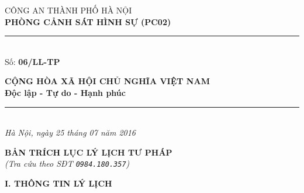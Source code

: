 \documentclass[12pt,a4paper]{article}
\begin{document}
\noindent
\begin{minipage}[t]{0.46\textwidth}
    \begin{center}
        \fontsize{11pt}{13pt}\selectfont
        CÔNG AN THÀNH PHỐ HÀ NỘI\\
        \textbf{PHÒNG CẢNH SÁT HÌNH SỰ (PC02)}\\[-0.2em]
        \rule{3.2cm}{0.6pt}\\[0.25cm]
        \fontsize{11pt}{13pt}\selectfont Số: \textbf{06/LL-TP}
    \end{center}
\end{minipage}
\hfill
\begin{minipage}[t]{0.52\textwidth}
    \begin{center}
        \fontsize{11pt}{13pt}\selectfont
        \textbf{CỘNG HÒA XÃ HỘI CHỦ NGHĨA VIỆT NAM}\\
        \textbf{Độc lập - Tự do - Hạnh phúc}\\[-0.2em]
        \rule{3.6cm}{0.6pt}\\[0.25cm]
        \textit{Hà Nội, ngày 25 tháng 07 năm 2016}
    \end{center}
\end{minipage}

\vspace{0.5cm}

\begin{center}
    \textbf{\Large BẢN TRÍCH LỤC LÝ LỊCH TƯ PHÁP}\\[0.15cm]
    \textit{(Tra cứu theo SĐT \texttt{0984.180.357})}
\end{center}

\vspace{0.3cm}


\vspace{0.3cm}\noindent\textbf{\large I. THÔNG TIN LÝ LỊCH}\\[0.15cm]
\end{document}
